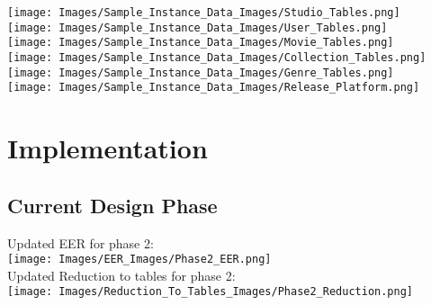 \documentclass[12pt]{article}
\begin{document}
{
    \setcounter{figure}{0}
    \centering
    \texttt{[image: Images/Sample\_Instance\_Data\_Images/Studio\_Tables.png]} \\ 
    \vspace{10pt}
    \texttt{[image: Images/Sample\_Instance\_Data\_Images/User\_Tables.png]} \\ 
    \vspace{10pt}
    \texttt{[image: Images/Sample\_Instance\_Data\_Images/Movie\_Tables.png]} \\ 
    \vspace{10pt}
    \texttt{[image: Images/Sample\_Instance\_Data\_Images/Collection\_Tables.png]} \\ 
    \vspace{10pt}
    \texttt{[image: Images/Sample\_Instance\_Data\_Images/Genre\_Tables.png]} \\ 
    \vspace{10pt}
    \texttt{[image: Images/Sample\_Instance\_Data\_Images/Release\_Platform.png]} \\ 
}

\section{Implementation}
\subsection{Current Design Phase}
Updated EER for phase 2:\\
\texttt{[image: Images/EER\_Images/Phase2\_EER.png]} \\

Updated Reduction to tables for phase 2:\\
\texttt{[image: Images/Reduction\_To\_Tables\_Images/Phase2\_Reduction.png]} \\

\end{document}
